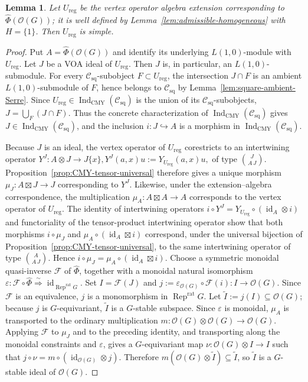 \documentclass[10pt,a4paper]{amsart}
\numberwithin{equation}{section} \newtheorem{thm}{Theorem}[section] \newtheorem{lem}[thm]{Lemma} \newtheorem{ex}[thm]{Example} \newtheorem{prop}[thm]{Proposition} \newtheorem{cor}[thm]{Corollary} \newtheorem{defi}[thm]{Definition} \newtheorem{rmk}[thm]{Remark} \newtheorem{notation}[thm]{Notation}
\newcommand{\id}{\operatorname{id}}
\newcommand{\Rep}{\operatorname{Rep}}
\newcommand{\OO}{\mathcal O}
\newcommand{\Csq}{\mathcal C_{\mathrm{sq}}}
\newcommand{\IndCMY}{\operatorname{Ind}_{\mathrm{CMY}}}
\begin{document}
\begin{lem}\label{lem:regular-simple}
Let $U_{\mathrm{reg}}$ be the vertex operator algebra extension corresponding to $\widehat\Phi(\OO(G))$; it is well defined by Lemma~\ref{lem:admissible-homogeneous} with $H=\{1\}$. Then $U_{\mathrm{reg}}$ is simple.
\end{lem}

\begin{proof}
Put $A=\widehat\Phi(\OO(G))$ and identify its underlying $L(1,0)$-module with $U_{\mathrm{reg}}$. Let $J$ be a VOA ideal of $U_{\mathrm{reg}}$. Then $J$ is, in particular, an $L(1,0)$-submodule. For every $\Csq$-subobject $F\subset U_{\mathrm{reg}}$, the intersection $J\cap F$ is an ambient $L(1,0)$-submodule of $F$, hence belongs to $\Csq$ by Lemma~\ref{lem:square-ambient-Serre}. Since $U_{\mathrm{reg}}\in\IndCMY(\Csq)$ is the union of its $\Csq$-subobjects, \(J=\bigcup_F(J\cap F).\) Thus the concrete characterization of $\IndCMY(\Csq)$ gives $J\in\IndCMY(\Csq)$, and the inclusion $i:J\hookrightarrow A$ is a morphism in $\IndCMY(\Csq)$.

Because $J$ is an ideal, the vertex operator of $U_{\mathrm{reg}}$ corestricts to an intertwining operator \(Y^J:A\otimes J\longrightarrow J\{x\},Y^J(a,x)u:=Y_{U_{\mathrm{reg}}}(a,x)u,\) of type $\binom{J}{A\,J}$. Proposition~\ref{prop:CMY-tensor-universal} therefore gives a unique morphism \(\mu_J:A\boxtimes J\to J\) corresponding to $Y^J$. Likewise, under the extension--algebra correspondence, the multiplication $\mu_A:A\boxtimes A\to A$ corresponds to the vertex operator of $U_{\mathrm{reg}}$. The identity of intertwining operators \(i\circ Y^J=Y_{U_{\mathrm{reg}}}\circ(\id_A\otimes i)\) and functoriality of the tensor-product intertwining operator show that both morphisms \(i\circ\mu_J\) and \(\mu_A\circ(\id_A\boxtimes i)\) correspond, under the universal bijection of Proposition~\ref{prop:CMY-tensor-universal}, to the same intertwining operator of type $\binom{A}{A\,J}$. Hence \(i\circ\mu_J=\mu_A\circ(\id_A\boxtimes i).\) Choose a symmetric monoidal quasi-inverse $\mathcal F$ of $\widehat\Phi$, together with a monoidal natural isomorphism \(\varepsilon:\mathcal F\circ\widehat\Phi \overset{\sim}{\Longrightarrow}\id_{\Rep^{\mathrm{rat}}G}\). Set \(I=\mathcal F(J)\) and \(j:=\varepsilon_{\OO(G)}\circ\mathcal F(i):I\longrightarrow\OO(G).\) Since $\mathcal F$ is an equivalence, $j$ is a monomorphism in $\Rep^{\mathrm{rat}}G$. Let \(\widetilde I:=j(I)\subseteq\OO(G)\); because $j$ is $G$-equivariant, $\widetilde I$ is a $G$-stable subspace. Since $\varepsilon$ is monoidal, $\mu_A$ is transported to the ordinary multiplication $m:\OO(G)\otimes\OO(G)\to\OO(G)$. Applying $\mathcal F$ to $\mu_J$ and to the preceding identity, and transporting along the monoidal constraints and $\varepsilon$, gives a $G$-equivariant map \(\nu:\OO(G)\otimes I\to I\) such that \(j\circ\nu=m\circ(\id_{\OO(G)}\otimes j).\) Therefore \(m(\OO(G)\otimes\widetilde I)\subseteq\widetilde I\), so $\widetilde I$ is a $G$-stable ideal of $\OO(G)$.


\end{proof}
\end{document}

